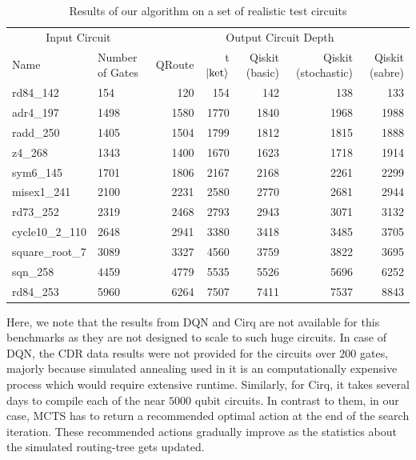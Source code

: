 \documentclass[%
 reprint,
 longbibliography,
 amsmath,amssymb,
 aps,
]{revtex4-2}
\begin{document}
\begin{table}[t]
    \caption{\label{tab:large-circuits}%
        Results of our algorithm on a set of realistic test circuits
    }
    \begin{ruledtabular}
        \begin{tabular}{ll|rrrrr}
            \multicolumn{2}{c}{\textrm{Input Circuit}} & \multicolumn{5}{c}{\textrm{Output Circuit Depth}} \\
            
            \textrm{Name} & \textrm{Number of Gates} & \textrm{QRoute} & \textrm{t$\ket{\text{ket}}$} & \textrm{Qiskit (basic)} & \textrm{Qiskit (stochastic)} & \textrm{Qiskit (sabre)} \\
            
            \colrule
            rd84\_142        &  154 &  120 &  154 &  142 &  138 &  133 \\
            adr4\_197        & 1498 & 1580 & 1770 & 1840 & 1968 & 1988 \\
            radd\_250        & 1405 & 1504 & 1799 & 1812 & 1815 & 1888 \\
            z4\_268          & 1343 & 1400 & 1670 & 1623 & 1718 & 1914 \\
            sym6\_145        & 1701 & 1806 & 2167 & 2168 & 2261 & 2299 \\
            misex1\_241      & 2100 & 2231 & 2580 & 2770 & 2681 & 2944 \\
            rd73\_252        & 2319 & 2468 & 2793 & 2943 & 3071 & 3132 \\
            cycle10\_2\_110  & 2648 & 2941 & 3380 & 3418 & 3485 & 3705 \\
            square\_root\_7  & 3089 & 3327 & 4560 & 3759 & 3822 & 3695 \\
            sqn\_258         & 4459 & 4779 & 5535 & 5526 & 5696 & 6252 \\
            rd84\_253        & 5960 & 6264 & 7507 & 7411 & 7537 & 8843 \\
        \end{tabular}
    \end{ruledtabular}
\end{table}

Here, we note that the results from DQN and Cirq are not available for this benchmarks as they are not designed to scale to such huge circuits. In case of DQN, the CDR data results were not provided for the circuits over $200$ gates, majorly because simulated annealing used in it is an computationally expensive process which would require extensive runtime. Similarly, for Cirq, it takes several days to compile each of the near $5000$ qubit circuits. In contrast to them, in our case, MCTS has to return a recommended optimal action at the end of the search iteration. These recommended actions gradually improve as the statistics about the simulated routing-tree gets updated. 
\end{document}
